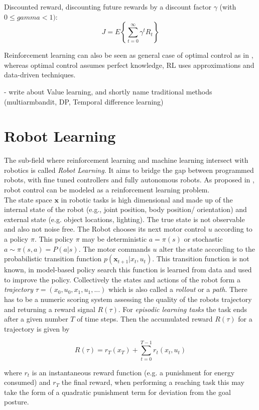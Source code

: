 Discounted reward, discounting future rewards by a discount factor $\gamma$
(with $0 \leq gamma < 1)$:
$$ J = E \left\{\sum^{\infty}_{t=0} \gamma^t R_t \right\} $$

Reinforcement learning can also be seen as
general case of optimal control as in \citet{sutton1992reinforcement},
whereas optimal control assumes perfect knowledge, RL uses approximations
and data-driven techniques.

- write about Value learning, and shortly name traditional methods (multiarmbandit,
DP, Temporal difference learning)


\section{Robot Learning}
The sub-field where reinforcement learning and machine learning
intersect with robotics is called \textit{Robot Learning}. It aims to bridge
the gap between programmed robots,
with fine tuned controllers  and fully autonomous robots.
As proposed in \citet{deisenroth2013survey}, robot control can be modeled as
a reinforcement learning problem. \\
The state space $\mathbf{x}$ in robotic tasks is high dimensional and made up of
the internal state of the robot (e.g., joint position, body position/ orientation)
and external state (e.g. object locations, lighting). The true state is
not observable and also not noise free. 
The Robot chooses its next motor control $u$ according to a policy $\pi$.
This policy $\pi$ may
be deterministic $a = \pi(s)$ or stochastic $a \sim \pi(s,a) = P(a | s)$.
The motor commands $u$ alter the state according to the probabilistic
transition function $p(\mathbf{x}_{t+1} | x_t, u_t)$. This transition function
is not known, in model-based policy search this function is learned from data and
used to improve the policy.
Collectively the states and actions of the robot form a
\textit{trajectory} $\tau = (x_0, u_0, x_1, u_1,...)$ which is also called
a \textit{rollout} or a \textit{path}.
There has to be a numeric scoring system assessing the quality
of the robots trajectory and returning a reward signal $R(\tau)$.
For \textit{episodic learning tasks} the task ends after a given number $T$ of time
steps. Then the accumulated reward $R(\tau)$ for a trajectory is given by

$$ R(\tau) = r_T(x_T) + \sum^{T-1}_{t=0} r_t(x_t,u_t) $$

where $r_t$ is an instantaneous reward function (e.g. a punishment for energy consumed)
and $r_T$ the final reward, when performing a reaching task this may take the
form of a quadratic punishment term for deviation from the goal posture.

